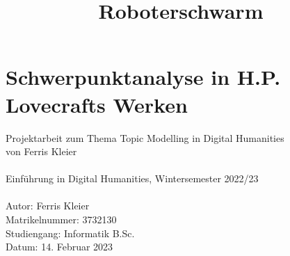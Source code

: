 \documentclass[11pt]{article}
\title{Roboterschwarm}
\begin{document}
     \section*{Schwerpunktanalyse in H.P. Lovecrafts Werken}
    Projektarbeit zum Thema Topic Modelling in Digital Humanities
    \\von Ferris Kleier\\\\
    Einführung in Digital Humanities, Wintersemester 2022/23\\\\
    Autor: Ferris Kleier\\
    Matrikelnummer: 3732130\\
    Studiengang: Informatik B.Sc.\\
    Datum: 14. Februar 2023

    
    
    
    
    
    
    
    
    
\end{document}
